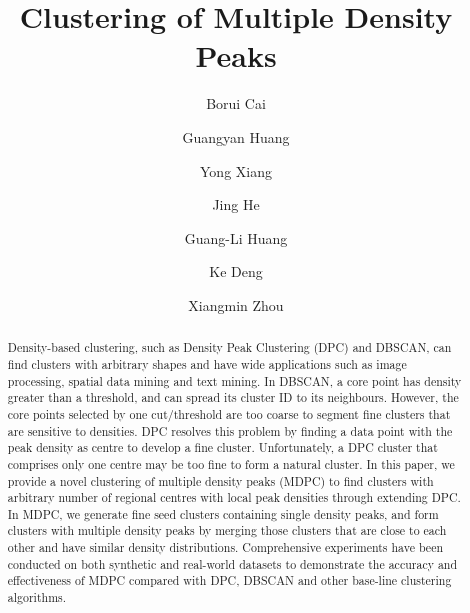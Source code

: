 \documentclass{llncs}
\begin{document}
%
\frontmatter %
%
\pagestyle{headings} %
%
\mainmatter %
%
\title{Clustering of Multiple Density Peaks}
%
%
\author{Borui Cai\inst{1\textrm{(\Letter)}} \and
Guangyan Huang \and
Yong Xiang  \and
Jing He  \and
Guang-Li Huang \and
Ke Deng \and
Xiangmin Zhou}
%
%
%


\maketitle %
\begin{abstract}
Density-based clustering, such as Density Peak Clustering (DPC) and DBSCAN, can find clusters with arbitrary shapes and have wide applications such as image processing, spatial data mining and text mining. In DBSCAN, a core point has density greater than a threshold, and can spread its cluster ID to its neighbours. However, the core points selected by one cut/threshold are too coarse to segment fine clusters that are sensitive to densities. DPC resolves this problem by finding a data point with the peak density as centre to develop a fine cluster. Unfortunately, a DPC cluster that comprises only one centre may be too fine to form a natural cluster. In this paper, we provide a novel clustering of multiple density peaks (MDPC) to find clusters with arbitrary number of regional centres with local peak densities through extending DPC. In MDPC, we generate fine seed clusters containing single density peaks, and form clusters with multiple density peaks by merging those clusters that are close to each other and have similar density distributions. Comprehensive experiments have been conducted on both synthetic and real-world datasets to demonstrate the accuracy and effectiveness of MDPC compared with DPC, DBSCAN and other base-line clustering algorithms.
\end{abstract}
%
\end{document}
